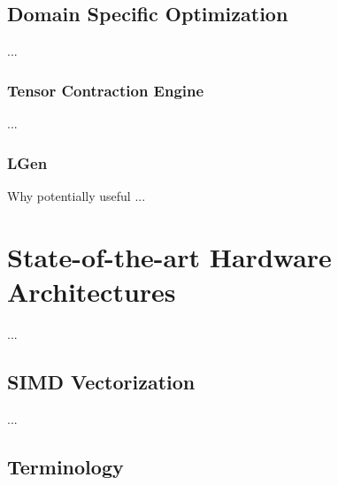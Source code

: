 

\subsection{Domain Specific Optimization}
...

\subsubsection{Tensor Contraction Engine}
...

\subsubsection{LGen}
Why potentially useful ...



\section{State-of-the-art Hardware Architectures}
\label{sec:bkg:arch}
...

\subsection{SIMD Vectorization}
...

\subsection{Terminology}
\label{sec:bkg:terminology}

